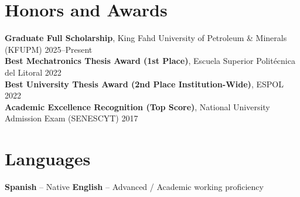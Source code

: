 \documentclass[10pt,a4paper]{article}
\begin{document}
\vspace{6pt}
\section*{Honors and Awards}

\textbf{Graduate Full Scholarship}, King Fahd University of Petroleum \& Minerals (KFUPM) \hfill 2025--Present\\
\textbf{Best Mechatronics Thesis Award (1st Place)}, Escuela Superior Politécnica del Litoral \hfill 2022\\
\textbf{Best University Thesis Award (2nd Place Institution-Wide)}, ESPOL \hfill 2022\\
\textbf{Academic Excellence Recognition (Top Score)}, National University Admission Exam (SENESCYT) \hfill 2017

\vspace{6pt}
\section*{Languages}

\textbf{Spanish} -- Native \qquad\qquad \textbf{English} -- Advanced / Academic working proficiency
\end{document}
